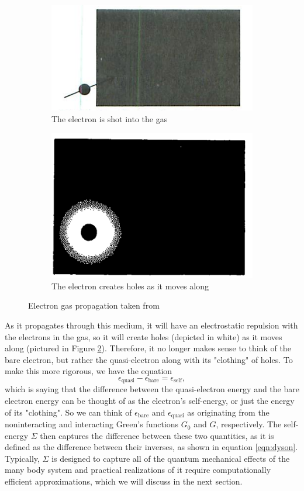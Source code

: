 \documentclass[12pt]{caltech_thesis}
\begin{document}
\begin{figure}
\begin{subfigure}{.5\textwidth}
  \centering
  \includegraphics[width=.8\linewidth]{shot.png}
  \caption{The electron is shot into the gas}
  \label{fig:shot}
\end{subfigure}
\begin{subfigure}{.5\textwidth}
  \centering
  \includegraphics[width=.8\linewidth]{clothing.png}
  \caption{The electron creates holes as it moves along}
  \label{fig:clothing}
\end{subfigure}
\caption{Electron gas propagation taken from \textcite{mattuck_guide_1992}}
\label{fig:propagates}
\end{figure}
As it propagates through this medium, it will have an electrostatic repulsion with the electrons in the gas, so it will create holes (depicted in white) as it moves along (pictured in Figure \ref{fig:clothing}). Therefore, it no longer makes sense to think of the bare electron, but rather the quasi-electron along with its "clothing" of holes. To make this more rigorous, we have the equation
\begin{equation}
    \epsilon_{\text{quasi}} - \epsilon_{\text{bare}} = \epsilon_{\text{self}},
\end{equation}
which is saying that the difference between the quasi-electron energy and the bare electron energy can be thought of as the electron's self-energy, or just the energy of its "clothing". So we can think of $\epsilon_{\text{bare}}$ and $\epsilon_{\text{quasi}}$ as originating from the noninteracting and interacting Green's functions $G_0$ and $G$, respectively. The self-energy $\Sigma$ then captures the difference between these two quantities, as it is defined as the difference between their inverses, as shown in equation \ref{eqn:dyson}.
 Typically, $\Sigma $ is designed to capture all of the quantum mechanical effects of the many body system and practical realizations of it require computationally efficient approximations, which we will discuss in the next section.
\end{document}

